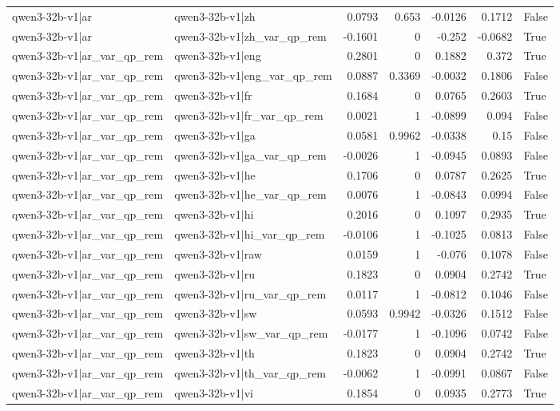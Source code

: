 \begin{table}
\begin{tabular}{l l r r r r l}
qwen3-32b-v1|ar & qwen3-32b-v1|zh & 0.0793 & 0.653 & -0.0126 & 0.1712 & False \\
qwen3-32b-v1|ar & qwen3-32b-v1|zh_var_qp_rem & -0.1601 & 0 & -0.252 & -0.0682 & True \\
qwen3-32b-v1|ar_var_qp_rem & qwen3-32b-v1|eng & 0.2801 & 0 & 0.1882 & 0.372 & True \\
qwen3-32b-v1|ar_var_qp_rem & qwen3-32b-v1|eng_var_qp_rem & 0.0887 & 0.3369 & -0.0032 & 0.1806 & False \\
qwen3-32b-v1|ar_var_qp_rem & qwen3-32b-v1|fr & 0.1684 & 0 & 0.0765 & 0.2603 & True \\
qwen3-32b-v1|ar_var_qp_rem & qwen3-32b-v1|fr_var_qp_rem & 0.0021 & 1 & -0.0899 & 0.094 & False \\
qwen3-32b-v1|ar_var_qp_rem & qwen3-32b-v1|ga & 0.0581 & 0.9962 & -0.0338 & 0.15 & False \\
qwen3-32b-v1|ar_var_qp_rem & qwen3-32b-v1|ga_var_qp_rem & -0.0026 & 1 & -0.0945 & 0.0893 & False \\
qwen3-32b-v1|ar_var_qp_rem & qwen3-32b-v1|he & 0.1706 & 0 & 0.0787 & 0.2625 & True \\
qwen3-32b-v1|ar_var_qp_rem & qwen3-32b-v1|he_var_qp_rem & 0.0076 & 1 & -0.0843 & 0.0994 & False \\
qwen3-32b-v1|ar_var_qp_rem & qwen3-32b-v1|hi & 0.2016 & 0 & 0.1097 & 0.2935 & True \\
qwen3-32b-v1|ar_var_qp_rem & qwen3-32b-v1|hi_var_qp_rem & -0.0106 & 1 & -0.1025 & 0.0813 & False \\
qwen3-32b-v1|ar_var_qp_rem & qwen3-32b-v1|raw & 0.0159 & 1 & -0.076 & 0.1078 & False \\
qwen3-32b-v1|ar_var_qp_rem & qwen3-32b-v1|ru & 0.1823 & 0 & 0.0904 & 0.2742 & True \\
qwen3-32b-v1|ar_var_qp_rem & qwen3-32b-v1|ru_var_qp_rem & 0.0117 & 1 & -0.0812 & 0.1046 & False \\
qwen3-32b-v1|ar_var_qp_rem & qwen3-32b-v1|sw & 0.0593 & 0.9942 & -0.0326 & 0.1512 & False \\
qwen3-32b-v1|ar_var_qp_rem & qwen3-32b-v1|sw_var_qp_rem & -0.0177 & 1 & -0.1096 & 0.0742 & False \\
qwen3-32b-v1|ar_var_qp_rem & qwen3-32b-v1|th & 0.1823 & 0 & 0.0904 & 0.2742 & True \\
qwen3-32b-v1|ar_var_qp_rem & qwen3-32b-v1|th_var_qp_rem & -0.0062 & 1 & -0.0991 & 0.0867 & False \\
qwen3-32b-v1|ar_var_qp_rem & qwen3-32b-v1|vi & 0.1854 & 0 & 0.0935 & 0.2773 & True \\

\end{tabular}
\end{table}
